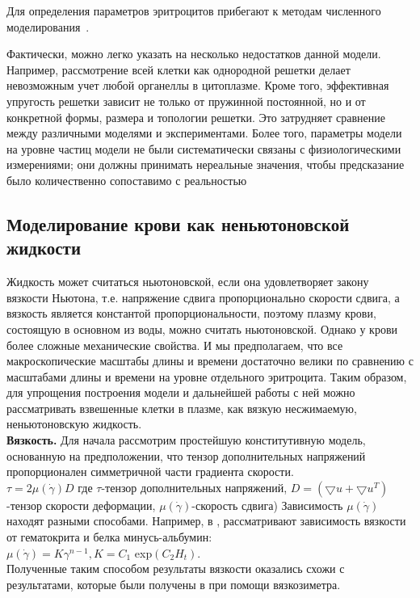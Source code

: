 Для определения параметров эритроцитов прибегают к методам численного моделирования~\cite{bessonov:2014}.

Фактически, можно легко указать на несколько недостатков данной модели. Например, рассмотрение всей клетки как однородной решетки делает невозможным учет любой органеллы в цитоплазме. Кроме того, эффективная упругость решетки зависит не только от пружинной постоянной, но и от конкретной формы, размера и топологии решетки. Это затрудняет сравнение между различными моделями и экспериментами. Более того, параметры модели на уровне частиц  модели не были систематически связаны с физиологическими измерениями; они должны принимать нереальные значения, чтобы предсказание было количественно сопоставимо с реальностью 


\subsection{Моделирование крови как неньютоновской жидкости}
Жидкость может считаться ньютоновской, если она удовлетворяет закону вязкости Ньютона, т.е. напряжение сдвига пропорционально скорости сдвига, а вязкость является константой пропорциональности, поэтому плазму крови, состоящую в основном из воды, можно считать ньютоновской. Однако у крови более сложные механические свойства. И мы предполагаем, что все макроскопические масштабы длины и времени достаточно велики по сравнению с масштабами длины и времени на уровне отдельного эритроцита. Таким образом, для упрощения построения модели и дальнейшей работы с ней можно рассматривать взвешенные клетки в плазме, как вязкую несжимаемую, неньютоновскую жидкость.\\

\textbf{Вязкость.}
Для начала рассмотрим простейшую конститутивную модель, основанную на предположении, что тензор дополнительных напряжений пропорционален
симметричной части градиента скорости.\\
$\tau=2\mu (\dot{\gamma})D$
где $\tau $-тензор дополнительных напряжений, $D=(\bigtriangledown u+\bigtriangledown u^T)$-тензор скорости деформации, $\mu (\dot{\gamma})$-скорость сдвига)
Зависимость $\mu (\dot{\gamma})$ находят разными способами. Например, в \cite{walburn:1976},   рассматривают зависимость вязкости от гематокрита и белка минусь-альбумин: \\
$
\mu (\dot{\gamma})=K{\gamma}^{n-1},  K=C_1$ exp$(C_2 H_t).
$\\
Полученные таким способом результаты вязкости оказались схожи с результатами, которые были получены в \cite{kim:2000} при помощи вязкозиметра.\\

